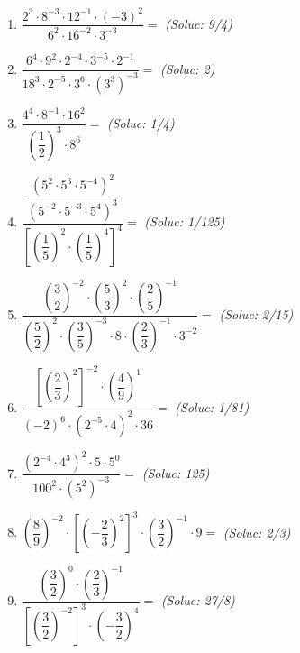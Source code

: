 \documentclass[a4paper,12pt]{article}
\begin{document}
\begin{enumerate}
\begin{enumerate}
            \item  $\dfrac{2^3 \cdot 8^{-3} \cdot 12^{-1} \cdot (-3)^2}{6^2 \cdot 16^{-2} \cdot 3^{-3}} =$ \hfill \textit{(Soluc: 9/4)}
            \item $\dfrac{6^4 \cdot 9^2 \cdot 2^{-4} \cdot 3^{-5} \cdot 2^{-1}}{18^3 \cdot 2^{-5} \cdot 3^6 \cdot \left(3^3\right)^{-3}} =$ \hfill \textit{(Soluc: 2)}
            \item $\dfrac{4^4 \cdot 8^{-1} \cdot 16^2}{\left(\dfrac{1}{2}\right)^3 \cdot 8^6} =$ \hfill \textit{(Soluc: 1/4)}
            \item $\dfrac{\dfrac{\left(5^2 \cdot 5^3 \cdot 5^{-4}\right)^2}{\left(5^{-2} \cdot 5^{-3} \cdot 5^4\right)^3}}{\left[\left(\dfrac{1}{5}\right)^2 \cdot \left(\dfrac{1}{5}\right)^4\right]^4} =$ \hfill \textit{(Soluc: 1/125)}
            \item $\dfrac{\left(\dfrac{3}{2}\right)^{-2} \cdot \left(\dfrac{5}{3}\right)^2 \cdot \left(\dfrac{2}{5}\right)^{-1}}{\left(\dfrac{5}{2}\right)^2 \cdot \left(\dfrac{3}{5}\right)^{-3} \cdot 8 \cdot \left(\dfrac{2}{3}\right)^{-1} \cdot 3^{-2}} =$ \hfill \textit{(Soluc: 2/15)}
            \item $\dfrac{\left[\left(\dfrac{2}{3}\right)^2\right]^{-2} \cdot \left(\dfrac{4}{9}\right)^1}{(-2)^6 \cdot \left(2^{-5} \cdot 4\right)^2 \cdot 36} =$ \hfill \textit{(Soluc: 1/81)}
            \item $\dfrac{\left(2^{-4} \cdot 4^3\right)^2 \cdot 5 \cdot 5^0}{100^2 \cdot \left(5^2\right)^{-3}} =$ \hfill \textit{(Soluc: 125)}
            \item $\left(\dfrac{8}{9}\right)^{-2} \cdot \left[\left(-\dfrac{2}{3}\right)^2\right]^3 \cdot \left(\dfrac{3}{2}\right)^{-1} \cdot 9 =$ \hfill \textit{(Soluc: 2/3)}
            \item $\dfrac{\left(\dfrac{3}{2}\right)^0 \cdot \left(\dfrac{2}{3}\right)^{-1}}{\left[\left(\dfrac{3}{2}\right)^{-2}\right]^3 \cdot \left(-\dfrac{3}{2}\right)^4} =$ \hfill \textit{(Soluc: 27/8)}
                    

\end{enumerate}
\end{enumerate}
\end{document}
